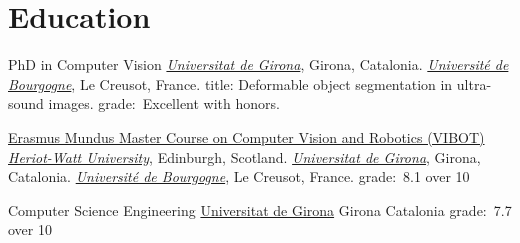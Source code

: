 \section{Education}

{PhD in Computer Vision}
{}
{}
{}
{\href{http://www.udg.edu}{\emph{Universitat de Girona}}, Girona, Catalonia.
  \newline\href{http://www.u-bourgogne.fr}{\emph{Universit\'{e} de Bourgogne}}, Le Creusot, France.
  \newline
  title: Deformable object segmentation in ultra-sound images.
  \newline grade:~Excellent with honors.
}

{\href{http://www.vibot.org}{Erasmus Mundus Master Course on Computer Vision and Robotics (VIBOT)}}
{}
{}
{}
{\href{http://www.hw.ac.uk}{\emph{Heriot-Watt University}}, Edinburgh, Scotland.
  \newline\href{http://www.udg.edu}{\emph{Universitat de Girona}}, Girona, Catalonia.
  \newline\href{http://www.u-bourgogne.fr}{\emph{Universit\'{e} de Bourgogne}}, Le Creusot, France.
  \newline grade:~8.1 over 10
}

                {Computer Science Engineering}
                {\newline\href{http://www.udg.edu}{Universitat de Girona}}
                {Girona}
                {Catalonia}
                {
                 grade:~7.7 over 10
                }

